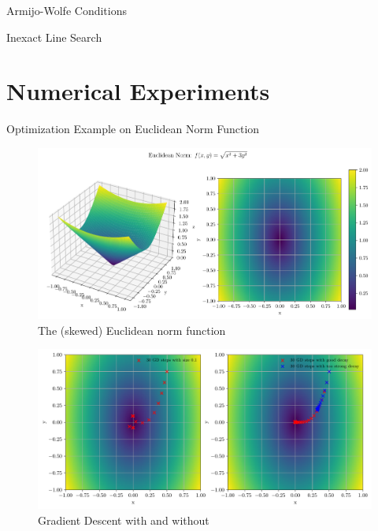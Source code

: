 \documentclass{beamer}
\begin{document}
\begin{frame}{Armijo-Wolfe Conditions}
\end{frame}

\begin{frame}{Inexact Line Search}
\end{frame}

\section{Numerical Experiments}
\begin{frame}{Optimization Example on Euclidean Norm Function}
     {
        \begin{figure}
            \centering
            \includegraphics[width=1.0\textwidth]{plots/euclidean_norm.pdf}
            \caption{The (skewed) Euclidean norm function}
            \label{fig:euclidean_norm_function}
        \end{figure}
    }
     {
        \begin{figure}
            \centering
            \includegraphics[width=1.0\textwidth]{plots/gd_steps.pdf}
            \caption{Gradient Descent with and without
}
\end{figure}}
\end{frame}
\end{document}
